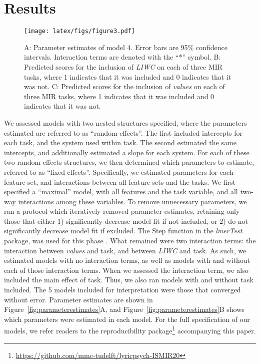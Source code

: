 \documentclass{article}
\begin{document}
\section{Results}\label{sec:result}

\begin{figure}
    \centering
    \texttt{[image: latex/figs/figure3.pdf]}
    \caption{A: Parameter estimates of model 4. Error bars are 95\% confidence intervals. Interaction terms are denoted with the ``*'' symbol. B: Predicted scores for the inclusion of \emph{LIWC} on each of three MIR tasks, where 1 indicates that it was included and 0 indicates that it was not. C: Predicted scores for the inclusion of \emph{values} on each of three MIR tasks, where 1 indicates that it was included and 0 indicates that it was not.}
    \label{fig:parameterestimates4}
\end{figure}

We assessed models with two nested structures specified, where the parameters estimated are referred to as ``random effects''. The first included intercepts for each task, and the system used within task. The second estimated the same intercepts, and additionally estimated a slope for each system. For each of these two random effects structures, we then determined which parameters to estimate, referred to as ``fixed effects''. Specifically, we estimated parameters for each feature set, and interactions between all feature sets and the tasks. We first specified a ``maximal'' model, with all features and the task variable, and all two-way interactions among these variables. To remove unnecessary parameters, we ran a protocol which iteratively removed parameter estimates, retaining only those that either 1) significantly decrease model fit if not included, or 2) do not significantly decrease model fit if excluded. The Step function in the \emph{lmerTest} package, was used for this phase \cite{kuznetsova2017lmertest}. What remained were two interaction terms: the interaction between \emph{values} and task, and between \emph{LIWC} and task. As such, we estimated models with no interaction terms, as well as models with and without each of those interaction terms. When we assessed the interaction term, we also included the main effect of task. Thus, we also ran models with and without task included. The 5 models included for interpretation were those that converged without error. Parameter estimates are shown in Figure~\ref{fig:parameterestimates}A, and Figure~\ref{fig:parameterestimates}B shows which parameters were estimated in each model. For the full specification of our models, we refer readers to the reproducibility package\footnote{\url{https://github.com/mmc-tudelft/lyricpsych-ISMIR20}} accompanying this paper.
\end{document}
